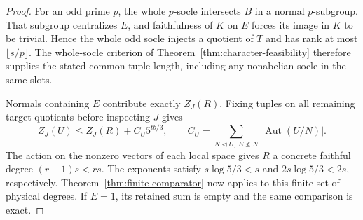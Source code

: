 \begin{proof}
For an odd prime $p$, the whole $p$-socle intersects $\bar B$
in a normal $p$-subgroup. That subgroup centralizes $\bar E$,
and faithfulness of $K$ on $\bar E$ forces its image in $K$ to
be trivial. Hence the whole odd socle injects a quotient of $T$
and has rank at most $\lfloor s/p\rfloor$. The whole-socle
criterion of Theorem~\ref{thm:character-feasibility} therefore
supplies the stated common tuple length, including any nonabelian
socle in the same slots.

Normals containing $E$ contribute exactly $Z_J(R)$. Fixing tuples
on all remaining target quotients before inspecting $J$ gives
\[
 Z_J(U)\leq Z_J(R)+C_U5^{tb/3},\qquad
 C_U=\sum_{N\lhd U,\ E\not\leq N}|\operatorname{Aut}(U/N)|.
\]
The action on the nonzero vectors of each local space gives $R$
a concrete faithful degree $(r-1)s<rs$. The exponents satisfy
$s\log5/3<s$ and $2s\log5/3<2s$, respectively.
Theorem~\ref{thm:finite-comparator} now applies to this finite
set of physical degrees. If $E=1$, its retained sum is empty and
the same comparison is exact.
\end{proof}

